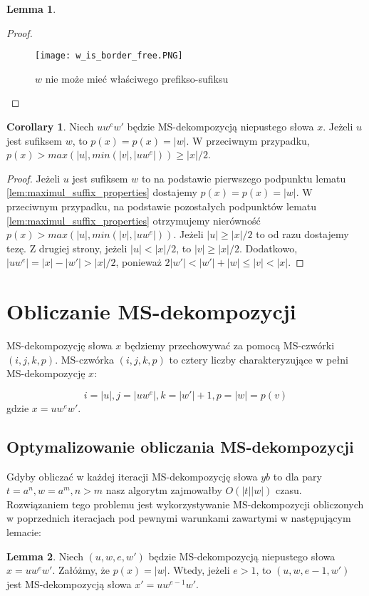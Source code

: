 \documentclass[a4paper,11pt]{article}
\theoremstyle{definition}
\newtheorem{lemma}{Lemma}[section]
\newtheorem{corollary}{Corollary}[lemma]
\begin{document}
\begin{lemma}
\begin{proof}
\begin{enumerate}
    \begin{figure}
    \centering
    \texttt{[image: w\_is\_border\_free.PNG]} \\
    \caption{$w$ nie może mieć właściwego prefikso-sufiksu}
    \label{fig:w_is_border_w}
    \end{figure}
\end{enumerate}
\end{proof}
\end{lemma}

\begin{corollary}\label{col:MS_decomposition_bounds}
Niech $uw^ew'$ będzie MS-dekompozycją niepustego słowa $x$. Jeżeli $u$ jest sufiksem $w$, to $p(x) = p(x) = |w|$. W przeciwnym przypadku, $p(x) > max(|u|, min(|v|, |uw^e|)) \geq |x|/2$.

\end{corollary}

\begin{proof}
Jeżeli $u$ jest sufiksem $w$ to na podstawie pierwszego podpunktu lematu \ref{lem:maximul_suffix_properties} dostajemy $p(x) = p(x) = |w|$. W przeciwnym przypadku, na podstawie pozostałych podpunktów lematu \ref{lem:maximul_suffix_properties} otrzymujemy nierówność $p(x) > max(|u|, min(|v|, |uw^e|))$. Jeżeli $|u| \geq |x|/2$ to od razu dostajemy tezę. Z drugiej strony, jeżeli $|u| < |x|/2$, to $|v| \geq |x|/ 2$. Dodatkowo, $|uw^e| = |x| - |w'| > |x| / 2$, ponieważ $2 |w'| < |w'| + |w| \leq |v| < |x|$.
\end{proof}

\section{Obliczanie MS-dekompozycji}
MS-dekompozycję słowa $x$ będziemy przechowywać za pomocą MS-czwórki $(i,j,k,p)$. MS-czwórka $(i,j,k,p)$ to cztery liczby charakteryzujące w pełni MS-dekompozycję $x$: 

\[ i = |u|, j = |uw^e|, k = |w'|+1, p = |w| = p(v) \]
gdzie $x = uw^ew'$.

\subsection{Optymalizowanie obliczania MS-dekompozycji}
Gdyby obliczać w każdej iteracji MS-dekompozycję słowa $yb$ to dla pary $t = a^n, w = a^m, n > m$ nasz algorytm zajmowałby $O(|t||w|)$ czasu. Rozwiązaniem tego problemu jest wykorzystywanie MS-dekompozycji obliczonych w poprzednich iteracjach pod pewnymi warunkami zawartymi w następującym lemacie:
\begin{lemma}\label{lem:maximul_suffix_of_prefix}
Niech $(u, w, e, w')$ będzie MS-dekompozycją niepustego słowa $x = uw^ew'$. Załóżmy, że $p(x) = |w|$. Wtedy, jeżeli $e > 1$, to $(u, w, e-1, w')$ jest MS-dekompozycją słowa $x' = uw^{e-1}w'$.
\end{lemma}
\end{document}
